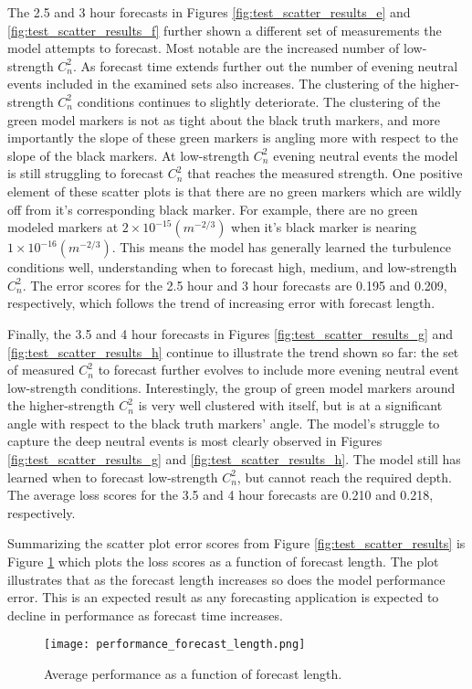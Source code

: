 The 2.5 and 3 hour forecasts in Figures \ref{fig:test_scatter_results_e} and \ref{fig:test_scatter_results_f} further shown a different set of measurements the model attempts to forecast. Most notable are the increased number of low-strength $C_{n}^{2}$. As forecast time extends further out the number of evening neutral events included in the examined sets also increases. The clustering of the higher-strength $C_{n}^{2}$ conditions continues to slightly deteriorate. The clustering of the green model markers is not as tight about the black truth markers, and more importantly the slope of these green markers is angling more with respect to the slope of the black markers. At low-strength $C_{n}^{2}$ evening neutral events the model is still struggling to forecast $C_{n}^{2}$ that reaches the measured strength. One positive element of these scatter plots is that there are no green markers which are wildly off from it's corresponding black marker. For example, there are no green modeled markers at $2 \times 10^{-15} (m^{-2/3})$ when it's black marker is nearing $1 \times 10^{-16} (m^{-2/3})$. This means the model has generally learned the turbulence conditions well, understanding when to forecast high, medium, and low-strength $C_{n}^{2}$. The error scores for the 2.5 hour and 3 hour forecasts are 0.195 and 0.209, respectively, which follows the trend of increasing error with forecast length.

Finally, the 3.5 and 4 hour forecasts in Figures \ref{fig:test_scatter_results_g} and \ref{fig:test_scatter_results_h} continue to illustrate the trend shown so far: the set of measured $C_{n}^{2}$ to forecast further evolves to include more evening neutral event low-strength conditions. Interestingly, the group of green model markers around the higher-strength $C_{n}^{2}$ is very well clustered with itself, but is at a significant angle with respect to the black truth markers' angle. The model's struggle to capture the deep neutral events is most clearly observed in Figures \ref{fig:test_scatter_results_g} and \ref{fig:test_scatter_results_h}. The model still has learned when to forecast low-strength $C_{n}^{2}$, but cannot reach the required depth. The average loss scores for the 3.5 and 4 hour forecasts are 0.210 and 0.218, respectively.

Summarizing the scatter plot error scores from Figure \ref{fig:test_scatter_results} is Figure \ref{fig:performance_forecast_length} which plots the loss scores as a function of forecast length. The plot illustrates that as the forecast length increases so does the model performance error. This is an expected result as any forecasting application is expected to decline in performance as forecast time increases.
\begin{figure}[h!]
	\centering
	\texttt{[image: performance\_forecast\_length.png]}
	\caption{Average performance as a function of forecast length.}
	\label{fig:performance_forecast_length}
\end{figure}

